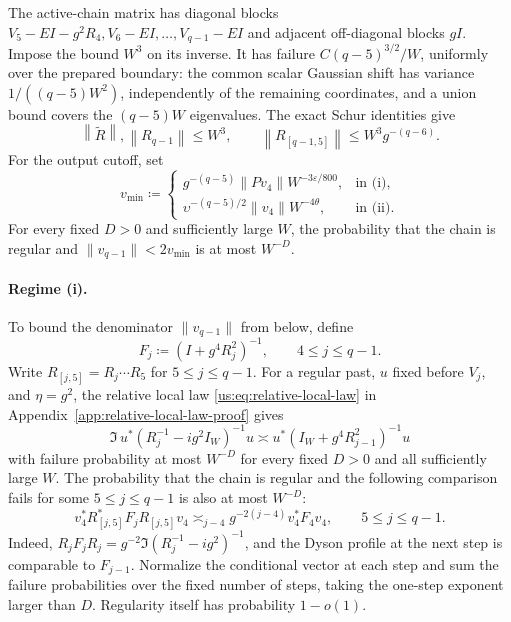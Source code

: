 \documentclass[11pt]{article}
\numberwithin{equation}{section}
\theoremstyle{remark}
\newcommand{\norm}[1]{\left\|#1\right\|}
\begin{document}
The active-chain matrix has diagonal blocks
$V_5-EI-g^2R_4,V_6-EI,\ldots,V_{q-1}-EI$ and adjacent off-diagonal
blocks $gI$. Impose the bound $W^3$ on its inverse. It has
failure $C(q-5)^{3/2}/W$, uniformly over the prepared boundary: the common
scalar Gaussian shift has variance $1/((q-5)W^2)$, independently of the
remaining coordinates, and a union bound covers the $(q-5)W$ eigenvalues.
The exact Schur identities give
\begin{equation}\label{su:eq:active-chain-inverse}
 \norm{\widetilde R},\norm{R_{q-1}}\le W^3,\qquad
 \norm{R_{[q-1,5]}}\le W^3g^{-(q-6)}.
\end{equation}
For the output cutoff, set
\begin{equation}\label{su:eq:output-cutoff-scale}
 v_{\min}\coloneqq
 \begin{cases}
 g^{-(q-5)}\|Pv_4\|W^{-3\varepsilon/800},&\text{in (i)},\\
 \upsilon^{-(q-5)/2}\|v_4\|W^{-4\theta},&\text{in (ii)}.
 \end{cases}
\end{equation}
For every fixed $D>0$ and sufficiently large $W$, the probability that the
chain is regular and $\|v_{q-1}\|<2v_{\min}$ is at most $W^{-D}$.

\paragraph{Regime (i).}
To bound the denominator $\|v_{q-1}\|$ from below, define
\[
 F_j\coloneqq(I+g^4R_j^2)^{-1},\qquad4\le j\le q-1.
\]
Write $R_{[j,5]}=R_j\cdots R_5$ for $5\le j\le q-1$.
For a regular past, $u$ fixed before $V_j$, and $\eta=g^2$, the
relative local law \eqref{us:eq:relative-local-law} in
Appendix~\ref{app:relative-local-law-proof} gives
\[
 \Im\,u^*(R_j^{-1}-ig^2 I_W)^{-1}u
 \asymp u^*(I_W+g^4R_{j-1}^2)^{-1}u
\]
with failure probability at most $W^{-D}$ for every fixed $D>0$ and all
sufficiently large $W$. The probability that the chain is regular and the
following comparison fails for some $5\le j\le q-1$ is also at most $W^{-D}$:
\begin{equation}
 v_4^*R_{[j,5]}^*F_jR_{[j,5]}v_4\asymp_{j-4}g^{-2(j-4)}v_4^*F_4v_4,
 \qquad 5\le j\le q-1.
 \label{us:eq:profile}
\end{equation}
Indeed, $R_jF_jR_j=g^{-2}\Im(R_j^{-1}-ig^2)^{-1}$, and the Dyson
profile at the next step is comparable to $F_{j-1}$. Normalize the
conditional vector at each step and sum the failure probabilities over
the fixed number of steps, taking the one-step exponent larger than $D$.
Regularity itself has probability $1-o(1)$.
\end{document}
